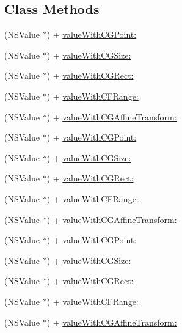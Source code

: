 \subsection*{Class Methods}
\begin{DoxyCompactItemize}
\item 
(N\+S\+Value $\ast$) + \mbox{\hyperlink{category_n_s_value_07_p_o_p_08_a2ce45e92c1ce2993c147006249d7f4c1}{value\+With\+C\+G\+Point\+:}}
\item 
(N\+S\+Value $\ast$) + \mbox{\hyperlink{category_n_s_value_07_p_o_p_08_a81be674dbdd3742aa6ba2bca882219c4}{value\+With\+C\+G\+Size\+:}}
\item 
(N\+S\+Value $\ast$) + \mbox{\hyperlink{category_n_s_value_07_p_o_p_08_aabb599f324e13bd9dfb554f3b9c174ab}{value\+With\+C\+G\+Rect\+:}}
\item 
(N\+S\+Value $\ast$) + \mbox{\hyperlink{category_n_s_value_07_p_o_p_08_a4c4bba9df57a4a0fb22eac3d852ce768}{value\+With\+C\+F\+Range\+:}}
\item 
(N\+S\+Value $\ast$) + \mbox{\hyperlink{category_n_s_value_07_p_o_p_08_a53ee551bb88c3f52fe46d88483de46f0}{value\+With\+C\+G\+Affine\+Transform\+:}}
\item 
(N\+S\+Value $\ast$) + \mbox{\hyperlink{category_n_s_value_07_p_o_p_08_a2ce45e92c1ce2993c147006249d7f4c1}{value\+With\+C\+G\+Point\+:}}
\item 
(N\+S\+Value $\ast$) + \mbox{\hyperlink{category_n_s_value_07_p_o_p_08_a81be674dbdd3742aa6ba2bca882219c4}{value\+With\+C\+G\+Size\+:}}
\item 
(N\+S\+Value $\ast$) + \mbox{\hyperlink{category_n_s_value_07_p_o_p_08_aabb599f324e13bd9dfb554f3b9c174ab}{value\+With\+C\+G\+Rect\+:}}
\item 
(N\+S\+Value $\ast$) + \mbox{\hyperlink{category_n_s_value_07_p_o_p_08_a4c4bba9df57a4a0fb22eac3d852ce768}{value\+With\+C\+F\+Range\+:}}
\item 
(N\+S\+Value $\ast$) + \mbox{\hyperlink{category_n_s_value_07_p_o_p_08_a53ee551bb88c3f52fe46d88483de46f0}{value\+With\+C\+G\+Affine\+Transform\+:}}
\item 
(N\+S\+Value $\ast$) + \mbox{\hyperlink{category_n_s_value_07_p_o_p_08_a2ce45e92c1ce2993c147006249d7f4c1}{value\+With\+C\+G\+Point\+:}}
\item 
(N\+S\+Value $\ast$) + \mbox{\hyperlink{category_n_s_value_07_p_o_p_08_a81be674dbdd3742aa6ba2bca882219c4}{value\+With\+C\+G\+Size\+:}}
\item 
(N\+S\+Value $\ast$) + \mbox{\hyperlink{category_n_s_value_07_p_o_p_08_aabb599f324e13bd9dfb554f3b9c174ab}{value\+With\+C\+G\+Rect\+:}}
\item 
(N\+S\+Value $\ast$) + \mbox{\hyperlink{category_n_s_value_07_p_o_p_08_a4c4bba9df57a4a0fb22eac3d852ce768}{value\+With\+C\+F\+Range\+:}}
\item 
(N\+S\+Value $\ast$) + \mbox{\hyperlink{category_n_s_value_07_p_o_p_08_a53ee551bb88c3f52fe46d88483de46f0}{value\+With\+C\+G\+Affine\+Transform\+:}}
\end{DoxyCompactItemize}


